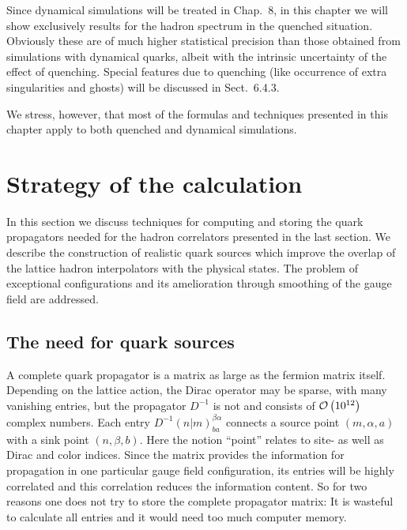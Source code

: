 Since dynamical simulations will be treated in Chap.~8, in this chapter we will
show exclusively results for the hadron spectrum in the quenched situation.
Obviously these are of much higher statistical precision than those obtained
from simulations with dynamical quarks, albeit with the intrinsic uncertainty
of the effect of quenching. Special features due to quenching (like occurrence
of extra singularities and ghosts) will be discussed in Sect.~6.4.3.

We stress, however, that most of the formulas and techniques presented in this
chapter apply to both quenched and dynamical simulations.

\section{Strategy of the calculation}

In this section we discuss techniques for computing and storing the quark
propagators needed for the hadron correlators presented in the last section. We
describe the construction of realistic quark sources which improve the overlap
of the lattice hadron interpolators with the physical states. The problem of
exceptional configurations and its amelioration through smoothing of the gauge
field are addressed.

\subsection{The need for quark sources}

A complete quark propagator is a matrix as large as the fermion matrix itself.
Depending on the lattice action, the Dirac operator may be sparse, with many
vanishing entries, but the propagator $D^{-1}$ is not and consists of
$\mathcal{O}\left(10^{12}\right)$ complex numbers. Each entry $D^{-1}(n|m)^{\beta\alpha}_{ba}$
connects a source point $(m, \alpha, a)$ with a sink point $(n, \beta, b)$.
Here the notion ``point'' relates to site- as well as Dirac and color indices.
Since the matrix provides the information for propagation in one particular
gauge field configuration, its entries will be highly correlated and this
correlation reduces the information content. So for two reasons one does not
try to store the complete propagator matrix: It is wasteful to calculate all
entries and it would need too much computer memory.

